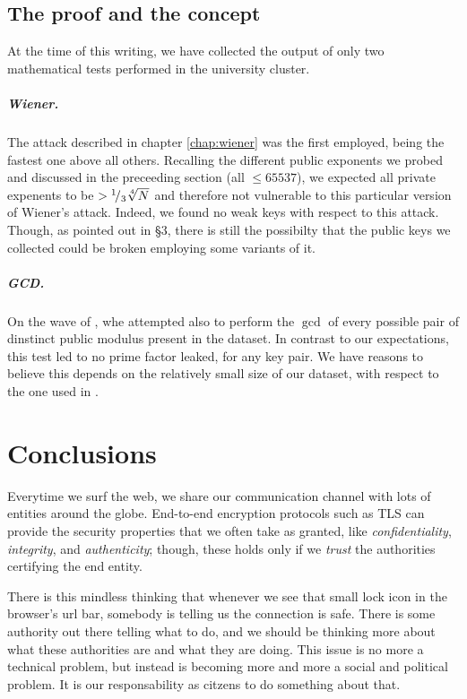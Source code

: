 \section{The proof and the concept}

At the time of this writing, we have collected the output of only two
mathematical tests performed in the university cluster.

\paragraph{Wiener.} The attack described in chapter \ref{chap:wiener} was the
first employed, being the fastest one above all others. Recalling the different
public exponents we probed and discussed in the preceeding section (all $\leq
65537$), we expected all private expenents to be $>  {}^{1}\!/_{3}\sqrt[4]{N}$
and therefore not vulnerable to this particular version of Wiener's attack.
Indeed, we found no weak keys with respect to this attack. Though, as
pointed out in \cite{20years} \S 3, there is still the possibilty that the
public keys we collected could be broken employing some variants of it.

\paragraph{GCD.} On the wave of \cite{ron:whit}, whe attempted also to perform
the $\gcd$ of every possible pair of dinstinct public modulus present in the
dataset. In contrast to our expectations, this test led to no prime factor
leaked, for any key pair. We have reasons to believe this depends on the
relatively small size of our dataset, with respect to the one used in
\cite{ron:whit}.



\chapter{Conclusions \label{conclusions}}

Everytime we surf the web, we share our communication channel with lots of
entities around the globe. End-to-end encryption protocols such as TLS can
provide the security  properties that we often take as granted, like
\emph{confidentiality}, \emph{integrity}, and \emph{authenticity}; though,
these holds only if we \emph{trust} the authorities certifying the end entity.

There is this mindless thinking that whenever we see that small lock icon in the
browser's url bar, somebody is telling us the connection is safe.
There is some authority out there telling what to do, and we should be thinking
more about what these authorities are and what they are doing.
This issue is no more a technical problem, but instead is becoming more and more
a social and political problem.
It is our responsability as citzens to do something about that.


